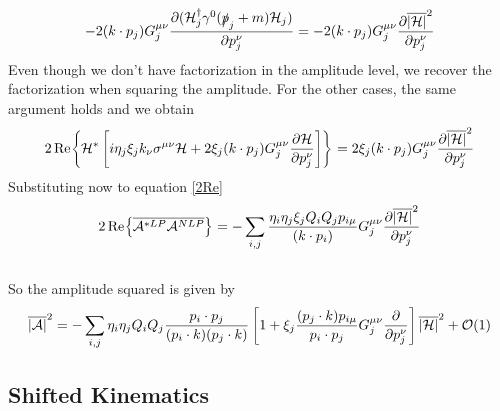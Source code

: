 \documentclass{article}
\newcommand{\s}[1]{\slashed #1}
\begin{document}
\begin{equation*}
	-2(k \cdot p_j) G_j^{\mu \nu}
	\pdv{(\mathcal{H}_j^\dag \gamma^0 (\s{p}_j + m)\mathcal{H}_j)}{p_j^\nu}
	= -2(k \cdot p_j) G_j^{\mu \nu} \pdv{\overline{|\mathcal{H}|}^2}{p_j^\nu}
\end{equation*}
Even though we don't have factorization in the amplitude level,
we recover the factorization when squaring the amplitude.
For the other cases, the same argument holds and we obtain
\begin{equation*}
	2\Re{
		\mathcal{H}^* \left[
			i\eta_j \xi_j k_\nu \sigma^{\mu\nu} \mathcal{H}
			+ 2\xi_j (k \cdot p_j) G_j^{\mu\nu} \pdv{\mathcal{H}}{p_{j}^\nu}
		\right]
	}
	= 2\xi_j (k \cdot p_j) G_j^{\mu \nu} \pdv{\overline{|\mathcal{H}|}^2}{p_j^\nu}
\end{equation*}
Substituting now to equation \eqref{2Re}
\begin{equation*}
	2\Re{\overline{\mathcal{A}^{*LP} \mathcal{A}^{NLP}}}
	= -\sum_{i,j} \frac{\eta_i \eta_j \xi_j Q_i Q_j p_{i\mu}}{(k \cdot p_i)}
	G_j^{\mu\nu} \pdv{\overline{|\mathcal{H}|}^2}{p_j^\nu}
\end{equation*}
\\
So the amplitude squared is given by
\begin{equation}
	\overline{|\mathcal{A}|}^2
	= - \sum_{i, j} \eta_i \eta_j Q_i Q_j
	\frac{p_i \cdot p_j}{(p_i \cdot k)(p_j \cdot k)}
	\left[
		1 + \xi_j \frac{(p_j \cdot k) p_{i\mu}}{p_i \cdot p_j} G_j^{\mu\nu} \pdv{p_j^\nu}
	\right]
	\overline{|\mathcal{H}|}^2+ \order{1}
\end{equation}

\subsection{Shifted Kinematics}
\end{document}
